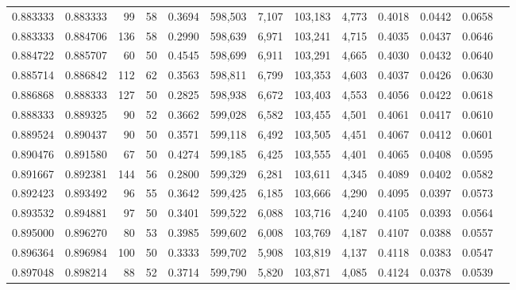 \begin{tabular}{rrrrrrrrrrrrr}
0.883333 & 0.883333 &     99 &    58 &                                     0.3694 & 598,503 &   7,107 & 103,183 &   4,773 & 0.4018 & 0.0442 & 0.0658 \\
0.883333 & 0.884706 &    136 &    58 &                                     0.2990 & 598,639 &   6,971 & 103,241 &   4,715 & 0.4035 & 0.0437 & 0.0646 \\
0.884722 & 0.885707 &     60 &    50 &                                     0.4545 & 598,699 &   6,911 & 103,291 &   4,665 & 0.4030 & 0.0432 & 0.0640 \\
0.885714 & 0.886842 &    112 &    62 &                                     0.3563 & 598,811 &   6,799 & 103,353 &   4,603 & 0.4037 & 0.0426 & 0.0630 \\
0.886868 & 0.888333 &    127 &    50 &                                     0.2825 & 598,938 &   6,672 & 103,403 &   4,553 & 0.4056 & 0.0422 & 0.0618 \\
0.888333 & 0.889325 &     90 &    52 &                                     0.3662 & 599,028 &   6,582 & 103,455 &   4,501 & 0.4061 & 0.0417 & 0.0610 \\
0.889524 & 0.890437 &     90 &    50 &                                     0.3571 & 599,118 &   6,492 & 103,505 &   4,451 & 0.4067 & 0.0412 & 0.0601 \\
0.890476 & 0.891580 &     67 &    50 &                                     0.4274 & 599,185 &   6,425 & 103,555 &   4,401 & 0.4065 & 0.0408 & 0.0595 \\
0.891667 & 0.892381 &    144 &    56 &                                     0.2800 & 599,329 &   6,281 & 103,611 &   4,345 & 0.4089 & 0.0402 & 0.0582 \\
0.892423 & 0.893492 &     96 &    55 &                                     0.3642 & 599,425 &   6,185 & 103,666 &   4,290 & 0.4095 & 0.0397 & 0.0573 \\
0.893532 & 0.894881 &     97 &    50 &                                     0.3401 & 599,522 &   6,088 & 103,716 &   4,240 & 0.4105 & 0.0393 & 0.0564 \\
0.895000 & 0.896270 &     80 &    53 &                                     0.3985 & 599,602 &   6,008 & 103,769 &   4,187 & 0.4107 & 0.0388 & 0.0557 \\
0.896364 & 0.896984 &    100 &    50 &                                     0.3333 & 599,702 &   5,908 & 103,819 &   4,137 & 0.4118 & 0.0383 & 0.0547 \\
0.897048 & 0.898214 &     88 &    52 &                                     0.3714 & 599,790 &   5,820 & 103,871 &   4,085 & 0.4124 & 0.0378 & 0.0539 \\

\end{tabular}
